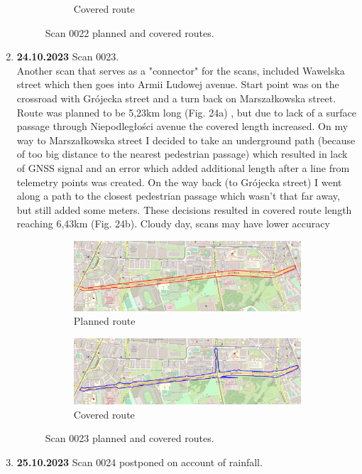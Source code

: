 \documentclass[a4paper,12pt]{article}
\begin{document}
\begin{enumerate}
\begin{figure}[H]
\begin{subfigure}{.90\textwidth}
			\caption{Covered route}
			\label{fig:b22}
		\end{subfigure}
		\caption{Scan 0022 planned and covered routes.}
		\label{fig:fig22}
	\end{figure}
	\pagebreak
	\item \textbf{24.10.2023} Scan 0023. \\
	 Another scan that serves as a "connector" for the scans, included Wawelska street which then goes into Armii Ludowej avenue. Start point was on the crossroad with Grójecka street and a turn back on Marszałkowska street. Route was planned to be 5,23km long (Fig. 24a) , but due to lack of a surface passage through Niepodległości avenue the covered length increased. On my way to Marszałkowska street I decided to take an underground path (because of too big distance to the nearest pedestrian passage) which resulted in lack of GNSS signal and an error which added additional length after a line from telemetry points was created. On the way back (to Grójecka street) I went along a path to the closest pedestrian passage which wasn't that far away, but still added some meters. These decisions resulted in covered route length reaching 6,43km (Fig. 24b). Cloudy day, scans may have lower accuracy
	\pagebreak
	\begin{figure}[H]
		\centering
		\begin{subfigure}{.90\textwidth}
			\centering
			\includegraphics[width=1\linewidth]{route_p23}
			\caption{Planned route}
			\label{fig:a23}
		\end{subfigure}%
		\linebreak
		\begin{subfigure}{.90\textwidth}
			\centering
			\includegraphics[width=1\linewidth]{route_c23}
			\caption{Covered route}
			\label{fig:b23}
		\end{subfigure}
		\caption{Scan 0023 planned and covered routes.}
		\label{fig:fig23}
	\end{figure}
	\pagebreak
	\item \textbf{25.10.2023} Scan 0024 postponed on account of rainfall.


\end{enumerate}
\end{document}
